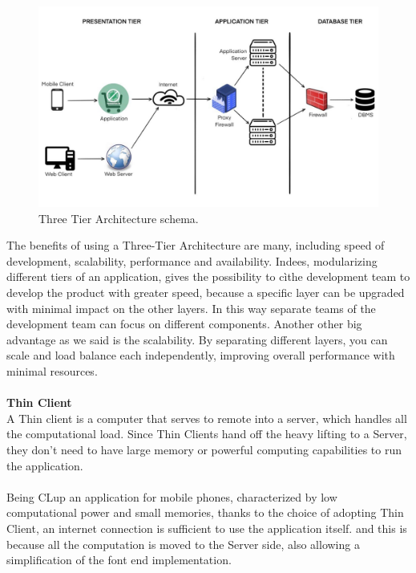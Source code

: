 \documentclass[a4paper, 12pt, oneside, table]{article}
\begin{document}
\begin{figure}[h!]
\centering
    \centering
    \includegraphics[height=0.35\textheight, scale=0.2, keepaspectratio]{img/three_tier_architecture.jpg} 
    \caption{Three Tier Architecture schema.}
    \label{three_tier_architecture}
\end{figure}
The benefits of using a Three-Tier Architecture are many, including speed of development, scalability, performance and availability. Indees, modularizing different tiers of an application, gives the possibility to cìthe development team to develop the product with greater speed, because a specific layer can be upgraded with minimal impact on the other layers. In this way separate teams of the development team can focus on different components. Another other big advantage as we said is the scalability. By separating different layers, you can scale and load balance each independently, improving overall performance with minimal resources.\\
\\
\textbf{Thin Client}\\
A Thin client is a computer that serves to remote into a server, which handles all the computational load. Since Thin Clients hand off the heavy lifting to a Server, they don't need to have large memory or powerful computing capabilities to run the application.\\
\\
Being CLup an application for mobile phones, characterized by low computational power and small memories, thanks to the choice of adopting Thin Client, an internet connection is sufficient to use the application itself. and this is because all the computation is moved to the Server side, also allowing a simplification of the font end implementation.\\
\end{document}
